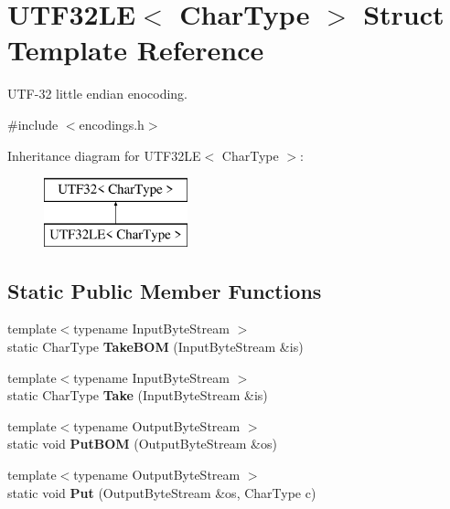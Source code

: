 \hypertarget{struct_u_t_f32_l_e}{}\section{U\+T\+F32\+LE$<$ Char\+Type $>$ Struct Template Reference}
\label{struct_u_t_f32_l_e}


U\+T\+F-\/32 little endian enocoding.  




{\ttfamily \#include $<$encodings.\+h$>$}

Inheritance diagram for U\+T\+F32\+LE$<$ Char\+Type $>$\+:\begin{figure}[H]
\begin{center}
\leavevmode
\includegraphics[height=2.000000cm]{struct_u_t_f32_l_e}
\end{center}
\end{figure}
\subsection*{Static Public Member Functions}
\begin{DoxyCompactItemize}
\item 
{\footnotesize template$<$typename Input\+Byte\+Stream $>$ }\\static Char\+Type {\bfseries Take\+B\+OM} (Input\+Byte\+Stream \&is)\hypertarget{struct_u_t_f32_l_e_a8729612b0a8b1126c61c4f8f8c34410e}{}\label{struct_u_t_f32_l_e_a8729612b0a8b1126c61c4f8f8c34410e}

\item 
{\footnotesize template$<$typename Input\+Byte\+Stream $>$ }\\static Char\+Type {\bfseries Take} (Input\+Byte\+Stream \&is)\hypertarget{struct_u_t_f32_l_e_ad13967549811be12897362bb37b2c819}{}\label{struct_u_t_f32_l_e_ad13967549811be12897362bb37b2c819}

\item 
{\footnotesize template$<$typename Output\+Byte\+Stream $>$ }\\static void {\bfseries Put\+B\+OM} (Output\+Byte\+Stream \&os)\hypertarget{struct_u_t_f32_l_e_accd97d45e55746c900dab356605825be}{}\label{struct_u_t_f32_l_e_accd97d45e55746c900dab356605825be}

\item 
{\footnotesize template$<$typename Output\+Byte\+Stream $>$ }\\static void {\bfseries Put} (Output\+Byte\+Stream \&os, Char\+Type c)\hypertarget{struct_u_t_f32_l_e_a61bb50e7fba27e3fe28a9f30eb366193}{}\label{struct_u_t_f32_l_e_a61bb50e7fba27e3fe28a9f30eb366193}

\end{DoxyCompactItemize}
